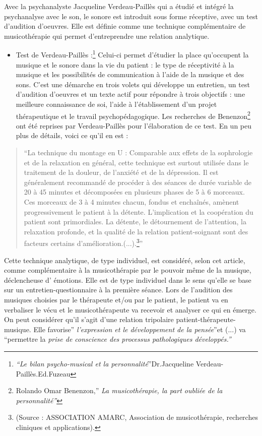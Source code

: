Avec la psychanalyste Jacqueline Verdeau-Paillès qui a étudié et intégré
la psychanalyse avec le son, le sonore est introduit sous forme réceptive,
avec un test d'audition d'oeuvres. Elle est définie comme une technique
complémentaire de musicothérapie qui permet d\textquoteright entreprendre
une relation analytique. 
\begin{itemize}
\item Test de Verdeau-Paillès :\footnote{\emph{``Le bilan psycho-musical et la personnalité}''Dr.Jacqueline
Verdeau-Paillès.Ed.Fuzeau} Celui-ci permet d'étudier la place qu'occupent la musique et le sonore
dans la vie du patient : le type de réceptivité à la musique et les
possibilités de communication à l'aide de la musique et des sons.
C'est une démarche en trois volets qui développe un entretien, un
test d'audition d'oeuvres et un texte actif pour répondre à trois
objectifs : une meilleure connaissance de soi, l'aide à l'établissement
d'un projet thérapeutique et le travail psychopédagogique. Les recherches
de Benenzon\footnote{Rolando Omar Benenzon,'' \emph{La musicothérapie, la part oubliée
de la personnalité''}} ont été reprises par Verdeau-Paillès pour l'élaboration de ce test.
En un peu plus de détails, voici ce qu'il en est :
\end{itemize}
\begin{quote}
``La technique du montage en U : Comparable aux effets de la sophrologie
et de la relaxation en général, cette technique est surtout utilisée
dans le traitement de la douleur, de l\textquoteright anxiété et de
la dépression. Il est généralement recommandé de procéder à des séances
de durée variable de 20 à 45 minutes et décomposées en plusieurs phases
de 5 à 6 morceaux. Ces morceaux de 3 à 4 minutes chacun, fondus et
enchaînés, amènent progressivement le patient à la détente. L\textquoteright implication
et la coopération du patient sont primordiales. La détente, le détournement
de l\textquoteright attention, la relaxation profonde, et la qualité
de la relation patient-soignant sont des facteurs certains d\textquoteright amélioration.(...).\footnote{(Source : ASSOCIATION AMARC, Association de musicothérapie, recherches
cliniques et applications).}''
\end{quote}
Cette technique analytique, de type individuel, est considéré, selon
cet article, comme complémentaire à la musicothérapie par le pouvoir
même de la musique, déclencheuse d' émotions. Elle est de type individuel
dans le sens qu'elle se base sur un entretien-questionnaire à la première
séance. Lors de l'audition des musiques choisies par le thérapeute
et/ou par le patient, le patient va en verbaliser le vécu et le musicothérapeute
va recevoir et analyser ce qui en émerge. On peut considérer qu'il
s'agit d'une relation tripolaire patient-thérapeute-musique. Elle
favorise''\emph{ l\textquoteright expression et le développement
de la pensée}''et (...) va ``permettre la \emph{prise de conscience
des processus pathologiques développés.'' }

